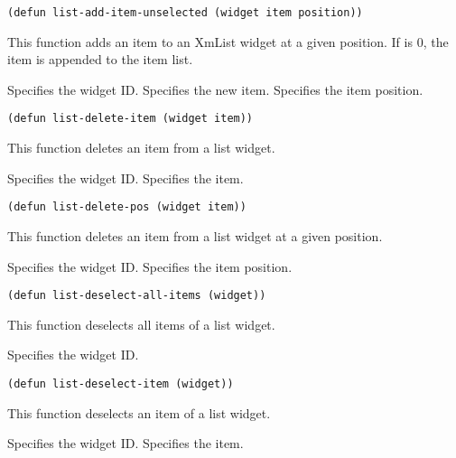 \begin{lispd}
\syntax\begin{verbatim}
(defun list-add-item-unselected (widget item position))
\end{verbatim}
\beschr This function adds an item to an XmList widget at a given position. If
 is $0$, the item is appended to the item list.
\parameter
\begin{paramd}
 Specifies the widget ID.
 Specifies the new item.
 Specifies the item position.
\end{paramd}
\end{lispd}

\begin{lispd}
\syntax\begin{verbatim}
(defun list-delete-item (widget item))
\end{verbatim}
\beschr This function deletes an item from a list widget.
\parameter
\begin{paramd}
 Specifies the widget ID.
 Specifies the item.
\end{paramd}
\end{lispd}
\pagebreak

\begin{lispd}
\syntax\begin{verbatim}
(defun list-delete-pos (widget item))
\end{verbatim}
\beschr This function deletes an item from a list widget at a given position.
\parameter
\begin{paramd}
 Specifies the widget ID.
 Specifies the item position.
\end{paramd}
\end{lispd}

\begin{lispd}
\syntax\begin{verbatim}
(defun list-deselect-all-items (widget))
\end{verbatim}
\beschr This function deselects all items of a list widget.
\parameter
\begin{paramd}
 Specifies the widget ID.
\end{paramd}
\end{lispd}

\begin{lispd}
\syntax\begin{verbatim}
(defun list-deselect-item (widget))
\end{verbatim}
\beschr This function deselects an item of a list widget.
\parameter
\begin{paramd}
 Specifies the widget ID.
 Specifies the item.
\end{paramd}
\end{lispd}

